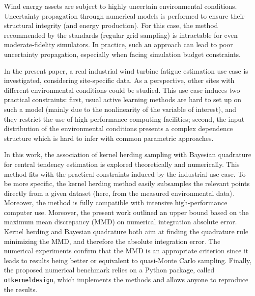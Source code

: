 Wind energy assets are subject to highly uncertain environmental conditions. 
Uncertainty propagation through numerical models is performed to ensure their structural integrity (and energy production). 
For this case, the method recommended by the standards (regular grid sampling) is intractable for even moderate-fidelity simulators. 
In practice, such an approach can lead to poor uncertainty propagation, especially when facing simulation budget constraints.

In the present paper, a real industrial wind turbine fatigue estimation use case is investigated, considering site-specific data. 
As a perspective, other sites with different environmental conditions could be studied. 
This use case induces two practical constraints: first, usual active learning methods are hard to set up on such a model (mainly due to the nonlinearity of the variable of interest), and they restrict the use of high-performance computing facilities; second, the input distribution of the environmental conditions presents a complex dependence structure which is hard to infer with common parametric approaches. 

In this work, the association of kernel herding sampling with Bayesian quadrature for central tendency estimation is explored theoretically and numerically. 
This method fits with the practical constraints induced by the industrial use case. 
To be more specific, the kernel herding method easily subsamples the relevant points directly from a given dataset (here, from the measured environmental data). 
Moreover, the method is fully compatible with intensive high-performance computer use. 
Moreover, the present work outlined an upper bound based on the maximum mean discrepancy (MMD) on numerical integration absolute error. 
Kernel herding and Bayesian quadrature both aim at finding the quadrature rule minimizing the MMD, and therefore the absolute integration error. 
The numerical experiments confirm that the MMD is an appropriate criterion since it leads to results being better or equivalent to quasi-Monte Carlo sampling. 
Finally, the proposed numerical benchmark relies on a Python package, called \texttt{\href{https://efekhari27.github.io/otkerneldesign/master/index.html}{otkerneldesign}}, which implements the methods and allows anyone to reproduce the results. 


